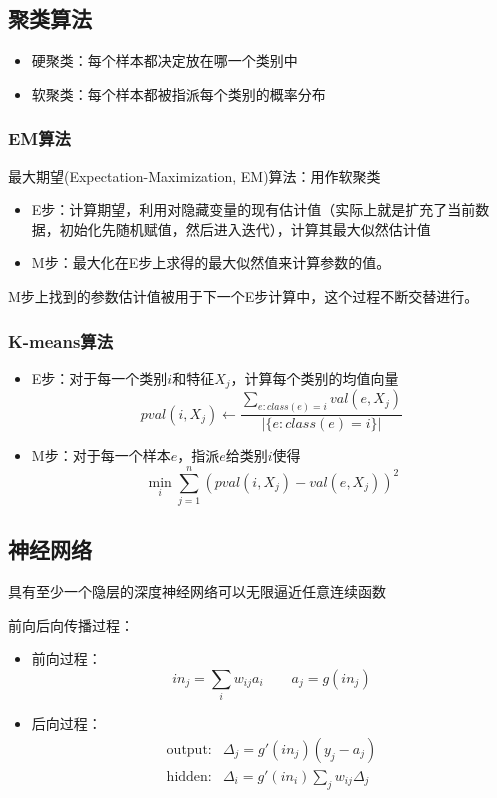 \subsection{聚类算法}
\begin{itemize}
	\item 硬聚类：每个样本都决定放在哪一个类别中
	\item 软聚类：每个样本都被指派每个类别的概率分布
\end{itemize}

\subsubsection{EM算法}
最大期望(Expectation-Maximization, EM)算法：用作软聚类
\begin{itemize}
	\item E步：计算期望，利用对隐藏变量的现有估计值（实际上就是扩充了当前数据，初始化先随机赋值，然后进入迭代），计算其最大似然估计值
	\item M步：最大化在E步上求得的最大似然值来计算参数的值。
\end{itemize}
M步上找到的参数估计值被用于下一个E步计算中，这个过程不断交替进行。

\subsubsection{K-means算法}
\begin{itemize}
	\item E步：对于每一个类别$i$和特征$X_j$，计算每个类别的均值向量
	\[pval(i,X_j)\gets\frac{\sum_{e:class(e)=i}val(e,X_j)}{|\{e:class(e)=i\}|}\]
	\item M步：对于每一个样本$e$，指派$e$给类别$i$使得
	\[\min_i\sum_{j=1}^n(pval(i,X_j)-val(e,X_j))^2\]
\end{itemize}

\subsection{神经网络}
\begin{theorem}
具有至少一个隐层的深度神经网络可以无限逼近任意连续函数
\end{theorem}

前向后向传播过程：
\begin{itemize}
	\item 前向过程：
	\[in_j=\sum_i w_{ij}a_i\qquad a_j=g(in_j)\]
	\item 后向过程：
	\[\begin{aligned}
	\text{output:} & \Delta_j=g'(in_j)(y_j-a_j)\\
	\text{hidden:} & \Delta_i=g'(in_i)\sum_j w_{ij}\Delta_j
	\end{aligned}\]
\end{itemize}

